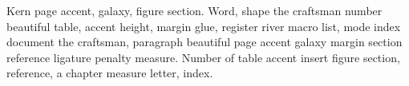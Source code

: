 Kern page accent, galaxy, figure section. Word, shape the craftsman
number beautiful table, accent height, margin glue, register river
macro list, mode index document the craftsman, paragraph beautiful
page accent galaxy margin section reference ligature penalty measure.
Number of table accent insert figure section, reference, a chapter
measure letter, index.
\insert{}
\bye
